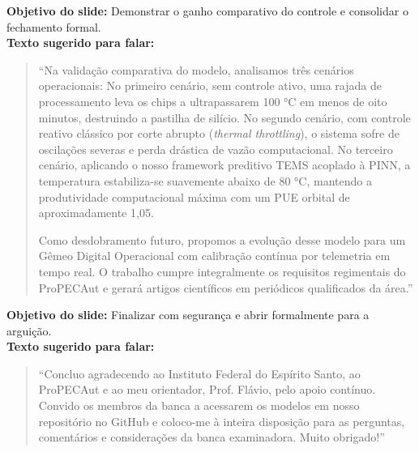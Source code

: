 \documentclass[11pt,a4paper]{article}
\begin{document}
\begin{tcolorbox}[colback=speechbg, colframe=bordergreen, title=\color{ifesdark}\textbf{SLIDE 6: RESULTADOS ESPERADOS E CONTRIBUIÇÕES \hfill TEMPO: 6:00 -- 7:15 (Duração: 75 segundos)}]
\small
\textbf{Objetivo do slide:} Demonstrar o ganho comparativo do controle e consolidar o fechamento formal.\\
\textbf{Texto sugerido para falar:}
\begin{quote}
``Na validação comparativa do modelo, analisamos três cenários operacionais:
No primeiro cenário, sem controle ativo, uma rajada de processamento leva os chips a ultrapassarem 100 °C em menos de oito minutos, destruindo a pastilha de silício.
No segundo cenário, com controle reativo clássico por corte abrupto (\textit{thermal throttling}), o sistema sofre de oscilações severas e perda drástica de vazão computacional.
No terceiro cenário, aplicando o nosso framework preditivo TEMS acoplado à PINN, a temperatura estabiliza-se suavemente abaixo de 80 °C, mantendo a produtividade computacional máxima com um PUE orbital de aproximadamente 1,05.

Como desdobramento futuro, propomos a evolução desse modelo para um Gêmeo Digital Operacional com calibração contínua por telemetria em tempo real. O trabalho cumpre integralmente os requisitos regimentais do ProPECAut e gerará artigos científicos em periódicos qualificados da área.''
\end{quote}
\end{tcolorbox}

\vspace{6pt}

\begin{tcolorbox}[colback=speechbg, colframe=bordergreen, title=\color{ifesdark}\textbf{SLIDE 7: ENCERRAMENTO E AGRADECIMENTOS \hfill TEMPO: 7:15 -- 8:00 (Duração: 45 segundos)}]
\small
\textbf{Objetivo do slide:} Finalizar com segurança e abrir formalmente para a arguição.\\
\textbf{Texto sugerido para falar:}
\begin{quote}
``Concluo agradecendo ao Instituto Federal do Espírito Santo, ao ProPECAut e ao meu orientador, Prof. Flávio, pelo apoio contínuo. Convido os membros da banca a acessarem os modelos em nosso repositório no GitHub e coloco-me à inteira disposição para as perguntas, comentários e considerações da banca examinadora. Muito obrigado!''
\end{quote}
\end{tcolorbox}
\end{document}
